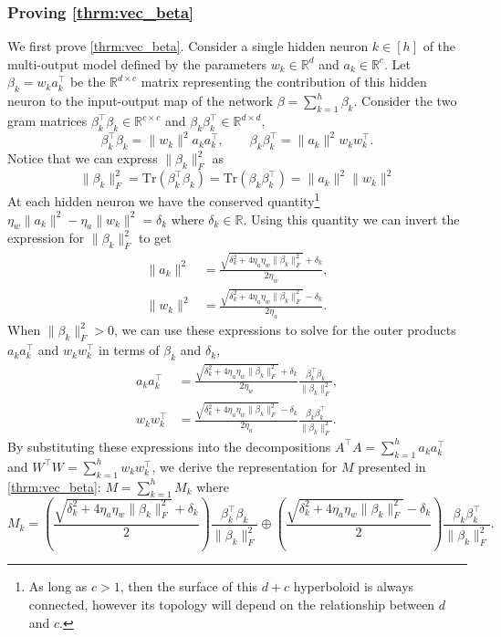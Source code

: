 \documentclass{article}
\theoremstyle{plain}
\theoremstyle{definition}
\theoremstyle{remark}
\begin{document}
\subsubsection{Proving \texorpdfstring{\cref{thrm:vec_beta}}{}}

We first prove \cref{thrm:vec_beta}.
%
Consider a single hidden neuron $k \in [h]$ of the multi-output model defined by the parameters $w_k \in \mathbb{R}^d$ and $a_k \in \mathbb{R}^c$.
%
Let $\beta_k = w_ka_k^\intercal$ be the $\mathbb{R}^{d \times c}$ matrix representing the contribution of this hidden neuron to the input-output map of the network $\beta = \sum_{k=1}^h \beta_k$.
%
Consider the two gram matrices $\beta_k^\intercal \beta_k \in \mathbb{R}^{c \times c}$ and $\beta_k \beta_k^\intercal \in \mathbb{R}^{d \times d}$,
\begin{equation}
    \beta_k^\intercal \beta_k = \|w_k\|^2 a_ka_k^\intercal, \qquad \beta_k\beta_k^\intercal = \|a_k\|^2 w_kw_k^\intercal.
\end{equation}
Notice that we can express $\|\beta_k\|_F^2$ as
\begin{equation}
    \|\beta_k\|_F^2 = \mathrm{Tr}(\beta_k^\intercal\beta_k) = \mathrm{Tr}(\beta_k\beta_k^\intercal) =  \|a_k\|^2\|w_k\|^2
\end{equation}
%
At each hidden neuron we have the conserved quantity\footnote{As long as $c > 1$, then the surface of this $d + c$ hyperboloid is always connected, however its topology will depend on the relationship between $d$ and $c$.} $\eta_w \|a_k\|^2 - \eta_a\|w_k\|^2 = \delta_k$ where $\delta_k \in \mathbb{R}$.
%
Using this quantity we can invert the expression for $\|\beta_k\|_F^2$ to get
\begin{align}
    \|a_k\|^2 &= \frac{\sqrt{\delta_k^2 + 4\eta_a \eta_w\|\beta_k\|_F^2} + \delta_k}{2\eta_w},\\
    \|w_k\|^2 &= \frac{\sqrt{\delta_k^2 + 4\eta_a \eta_w\|\beta_k\|_F^2} - \delta_k}{2\eta_a}.
\end{align}
When $\|\beta_k\|_F^2 > 0$, we can use these expressions to solve for the outer products $a_ka_k^\intercal$ and $w_kw_k^\intercal$ in terms of $\beta_k$ and $\delta_k$,
\begin{align}
    a_ka_k^\intercal &= \frac{\sqrt{\delta_k^2 + 4\eta_a \eta_w \|\beta_k\|_F^2} + \delta_k}{2\eta_w} \frac{\beta_k^\intercal\beta_k}{\|\beta_k\|_F^2},\\
    w_kw_k^\intercal &= \frac{\sqrt{\delta_k^2 + 4\eta_a \eta_w \|\beta_k\|_F^2} - \delta_k}{2\eta_a} \frac{\beta_k\beta_k^\intercal}{\|\beta_k\|_F^2}.
\end{align}
By substituting these expressions into the decompositions $A^\intercal A = \sum_{k=1}^h a_ka_k^\intercal$ and $W^\intercal W = \sum_{k=1}^h w_k w_k^\intercal$, we derive the representation for $M$ presented in \cref{thrm:vec_beta}: $M = \sum_{k = 1}^h M_k$ where
\begin{equation}
    M_k = \left(\frac{\sqrt{\delta_k^2 + 4\eta_a\eta_w\|\beta_k\|_F^2} + \delta_k}{2}\right)\frac{\beta_k^\intercal\beta_k}{\|\beta_k\|_F^2} \oplus \left(\frac{\sqrt{\delta_k^2 + 4\eta_a\eta_w\|\beta_k\|_F^2} - \delta_k}{2}\right)\frac{\beta_k\beta_k^\intercal}{\|\beta_k\|_F^2}.
\end{equation}
\end{document}
